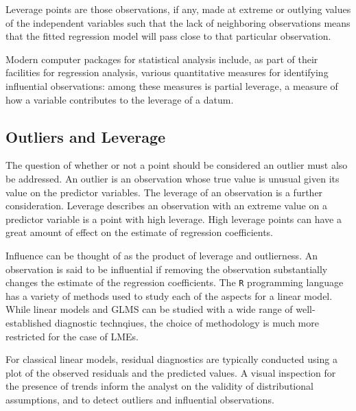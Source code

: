 \documentclass[12pt, a4paper]{article}
\begin{document}
Leverage points are those observations, if any, made at extreme or outlying values of the independent variables such that the lack of neighboring observations means that the fitted regression model will pass close to that particular observation.

Modern computer packages for statistical analysis include, as part of their facilities for regression analysis, various quantitative measures for identifying influential observations: among these measures is partial leverage, a measure of how a variable contributes to the leverage of a datum.




\subsection{Outliers and Leverage}


The question of whether or not a point should be considered an outlier must also be addressed. An outlier is an observation whose true value is unusual given its value on the predictor variables. The leverage of an observation is a further consideration. Leverage describes an observation with an extreme value on a predictor variable is a point with high leverage. High leverage points can have a great amount of effect on the estimate of regression coefficients.

Influence can be thought of as the product of leverage and outlierness. An observation is said to be influential if removing the observation substantially changes the estimate of the regression coefficients. The \texttt{R} programming language has a variety of methods used to study each of the aspects for a linear model. While linear models and GLMS can be studied with a wide range of well-established diagnostic technqiues, the choice of methodology is much more restricted for the case of LMEs.

For classical linear models, residual diagnostics are typically conducted using a plot of the observed residuals and the predicted values. A visual inspection for the presence of trends inform the analyst on the validity of distributional assumptions, and to detect outliers and influential observations.
\end{document}
